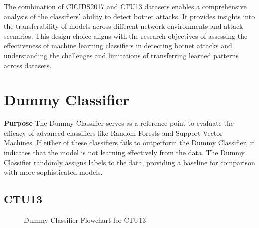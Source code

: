 The combination of CICIDS2017 and CTU13 datasets enables a comprehensive analysis of the classifiers' ability to detect botnet attacks. It provides insights into the transferability of models across different network environments and attack scenarios. This design choice aligns with the research objectives of assessing the effectiveness of machine learning classifiers in detecting botnet attacks and understanding the challenges and limitations of transferring learned patterns across datasets.

\section{Dummy Classifier}\label{sec:DummyClassifier}

\textbf{Purpose} The Dummy Classifier serves as a reference point to evaluate the efficacy of advanced classifiers like Random Forests and Support Vector Machines. If either of these classifiers fails to outperform the Dummy Classifier, it indicates that the model is not learning effectively from the data. The Dummy Classifier randomly assigns labels to the data, providing a baseline for comparison with more sophisticated models.

\subsection{CTU13}

\begin{figure}[H]
\centering
{}
\caption{Dummy Classifier Flowchart for CTU13}\label{fig:DummyRandomFlowCTU13}
\end{figure}

